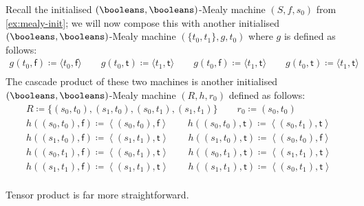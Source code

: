 \begin{example}\label{ex:mealy-cascade}
    Recall the initialised \((\booleans,\booleans)\)-Mealy machine
    \((S, f, s_0)\) from \cref{ex:mealy-init}; we will now compose this with
    another initialised \((\booleans,\booleans)\)-Mealy machine
    \((\{t_0,t_1\},g,t_0)\) where \(g\) is defined as follows:
    \begin{gather*}
        g(t_0, \mathsf{f}) \coloneqq \langle{t_0,\mathsf{f}}\rangle
        \qquad
        g(t_0, \mathsf{t}) \coloneqq \langle{t_1,\mathsf{t}}\rangle
        \qquad
        g(t_0, \mathsf{f}) \coloneqq \langle{t_1,\mathsf{t}}\rangle
        \qquad
        g(t_0, \mathsf{t}) \coloneqq \langle{t_1,\mathsf{t}}\rangle
        \\
        
    \end{gather*}
    The cascade product of these two machines is another initialised
    \((\booleans,\booleans)\)-Mealy machine \((R,h,r_0)\) defined as follows:
    \begin{gather*}
        R \coloneqq \{(s_0,t_0), (s_1,t_0), (s_0,t_1), (s_1,t_1)\}
        \qquad
        r_0 \coloneqq (s_0,t_0)
        \\
        h((s_0, t_0), \mathsf{f})
        \coloneqq
        \left\langle(s_0, t_0), \mathsf{f}\right\rangle
        \qquad
        h((s_0, t_0), \mathsf{t})
        \coloneqq
        \left\langle(s_0, t_1), \mathsf{t}\right\rangle
        \\
        h((s_1, t_0), \mathsf{f})
        \coloneqq
        \left\langle(s_1, t_1), \mathsf{t}\right\rangle
        \qquad
        h((s_1, t_0), \mathsf{t})
        \coloneqq
        \left\langle(s_0, t_0), \mathsf{f}\right\rangle
        \\
        h((s_0, t_1), \mathsf{f})
        \coloneqq
        \left\langle(s_0, t_1), \mathsf{t}\right\rangle
        \qquad
        h((s_0, t_1), \mathsf{t})
        \coloneqq
        \left\langle(s_1, t_1), \mathsf{t}\right\rangle
        \\
        h((s_1, t_1), \mathsf{f})
        \coloneqq
        \left\langle(s_1, t_1), \mathsf{t}\right\rangle
        \qquad
        h((s_1, t_1), \mathsf{t})
        \coloneqq
        \left\langle(s_0, t_1), \mathsf{t}\right\rangle
        \\
        
    \end{gather*}
\end{example}

Tensor product is far more straightforward.

